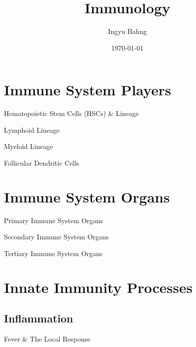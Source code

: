 \documentclass[10pt]{article}
\title{Immunology}
\date{\today}
\author{Ingyu Bahng}
\begin{document}


\section{Immune System Players}

  \begin{core}{Hematopoietic Stem Cells (HSCs) \& Lineage}

  \end{core}

  \begin{core}{Lymphoid Lineage}

  \end{core}

  \begin{core}{Myeloid Lineage}

  \end{core}

  \begin{core}{Follicular Dendritic Cells}

  \end{core}

\section{Immune System Organs}

  \begin{core}{Primary Immune System Organs}

  \end{core}

  \begin{core}{Secondary Immune System Organs}

  \end{core}

  \begin{core}{Tertiary Immune System Organs}

  \end{core}

\section{Innate Immunity Processes}

  \subsection{Inflammation}

    \begin{core}{Fever \& The Local Response}

    \end{core}
\end{document}
